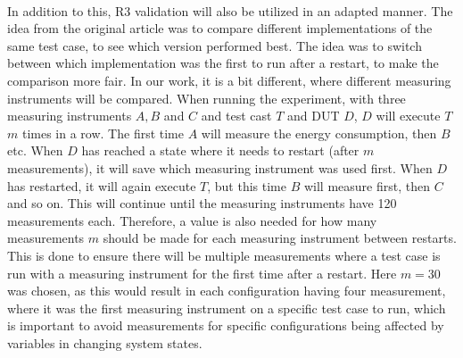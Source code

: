 \paragraph*{}
In addition to this, R3 validation\cite[]{Bokhari2020r3} will also be utilized in an adapted manner. The idea from the original article was to compare different implementations of the same test case, to see which version performed best. The idea was to switch between which implementation was the first to run after a restart, to make the comparison more fair. In our work, it is a bit different, where different measuring instruments will be compared. When running the experiment, with three measuring instruments $A, B$ and $C$ and test cast $T$ and DUT $D$, $D$ will execute $T$ $m$ times in a row. The first time $A$ will measure the energy consumption, then $B$ etc. When $D$ has reached a state where it needs to restart (after $m$ measurements), it will save which measuring instrument was used first. When $D$ has restarted, it will again execute $T$, but this time $B$ will measure first, then $C$ and so on. This will continue until the measuring instruments have 120 measurements each. Therefore, a value is also needed for how many measurements $m$ should be made for each measuring instrument between restarts. This is done to ensure there will be multiple measurements where a test case is run with a measuring instrument for the first time after a restart. Here $m=30$ was chosen, as this would result in each configuration having four measurement, where it was the first measuring instrument on a specific test case to run, which is important to avoid measurements for specific configurations being affected by variables in changing system states.
